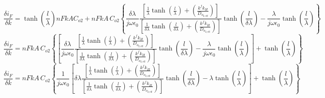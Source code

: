 \documentclass[Notes.tex]{subfiles}
\begin{document}
\begin{equation}
	\frac{\delta i_F}{\delta k} = \tanh{\left(\frac{l}{\lambda}\right)}  nFkAC_{o2} + nFkA\, C_{o2}  \left\lbrace\frac{\delta\lambda}{j\omega\epsilon_0} \frac{\left[\frac{1}{\lambda}  \tanh{\left(\frac{l}{\lambda}\right)} + \left(\frac{k^f k_H} {D_{o_{2,\textrm{eff}}}}\right) \right]}{\left[ \frac{1} {\delta\lambda} \tanh{\left(\frac{l}{\delta\lambda}\right)} + \left(\frac{k^f k_H} {D_{o_{2,\textrm{eff}}}}\right) \right]} \tanh{\left(\frac{l}{\delta\lambda} \right)} - \frac{\lambda}{j\omega\epsilon_0} \tanh{\left(\frac{l}{\lambda}\right)} \right\rbrace \nonumber
\end{equation}
\begin{equation}
	\frac{\delta i_F}{\delta k} = nFkA\, C_{o2} \left\{\left[ \frac{\delta\lambda}{j\omega\epsilon_0} \frac{\left[\frac{1}{\lambda}  \tanh{\left(\frac{l}{\lambda}\right)} + \left(\frac{k^f k_H} {D_{o_{2,\textrm{eff}}}}\right) \right]}{\left[ \frac{1} {\delta\lambda} \tanh{\left(\frac{l}{\delta\lambda}\right)} + \left(\frac{k^f k_H} {D_{o_{2,\textrm{eff}}}}\right) \right]} \tanh{\left(\frac{l}{\delta\lambda} \right)} - \frac{\lambda}{j\omega\epsilon_0} \tanh{\left(\frac{l}{\lambda}\right)} \right] +\tanh{\left(\frac{l}{\lambda}\right)} \right\}\nonumber
\end{equation}
\begin{equation}
	\frac{\delta i_F}{\delta k} = nFkA\, C_{o2} \left\{\frac{1}{j\omega\epsilon_0} \left[\delta\lambda \frac{\left[\frac{1}{\lambda}  \tanh{\left(\frac{l}{\lambda}\right)} + \left(\frac{k^f k_H} {D_{o_{2,\textrm{eff}}}}\right) \right]}{\left[ \frac{1} {\delta\lambda} \tanh{\left(\frac{l}{\delta\lambda}\right)} + \left(\frac{k^f k_H} {D_{o_{2,\textrm{eff}}}}\right) \right]} \tanh{\left(\frac{l}{\delta\lambda} \right)} - {\lambda} \tanh{\left(\frac{l}{\lambda}\right)} \right] +\tanh{\left(\frac{l}{\lambda}\right)} \right\}\nonumber
\end{equation}
\end{document}
